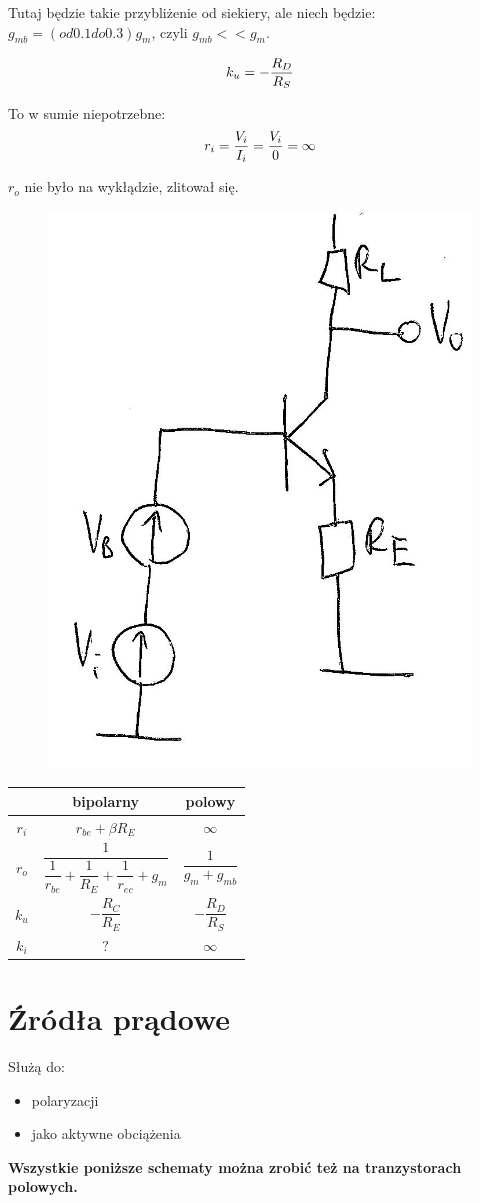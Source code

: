 \documentclass[10pt,a4paper]{article}
\begin{document}
Tutaj będzie takie przybliżenie od siekiery, ale niech będzie: $g_{mb} = (od 0.1 do 0.3) g_m$, czyli $g_{mb} << g_m$.

\begin{equation}
k_u =-{ R_D \over R_S}
\end{equation}

To w sumie niepotrzebne:
\begin{equation}
r_i = {V_i \over I_i} = {V_i \over 0} = \infty
\end{equation}

$r_o$ nie było na wykłądzie, zlitował się.


\begin{figure}[H]
\centering
\includegraphics[height=0.5\textwidth]{WDE}
\end{figure}
\begin{tabular}{c|c|c}
& bipolarny & polowy\\
\hline
$r_i$ & $r_{be} + \beta R_E$ & $\infty$ \\ 

$r_o$ & $\dfrac{1}{\dfrac{1}{r_{be}}+\dfrac{1}{R_E}+\dfrac{1}{r_{ec}}+g_m}$ & $\dfrac{1}{g_m + g_{mb}}$ \\ 

$k_u$ & $-\dfrac{R_C}{R_E}$ & $-\dfrac{R_D}{R_S}$ \\ 

$k_i$ & $?$ & $\infty$ \\ 

\end{tabular} 

\section{Źródła prądowe}
Służą do:
\begin{itemize}
\item{polaryzacji}
\item{jako aktywne obciążenia}
\end{itemize}
\textbf{Wszystkie poniższe schematy można zrobić też na tranzystorach polowych.}
\end{document}
